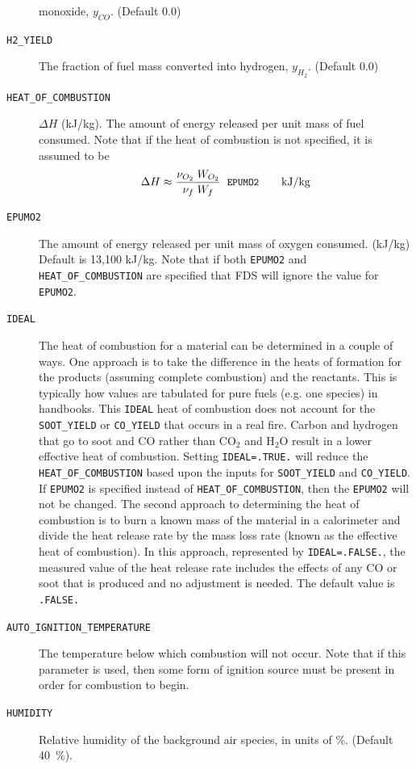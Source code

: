 \documentclass[11pt]{book}
\newcommand{\ct}{\tt\small}
\newcommand{\be}{\begin{equation}}
\newcommand{\ee}{\end{equation}}
\begin{document}
\begin{description}
monoxide, $y_{CO}$. (Default 0.0)
\item[{\ct H2\_YIELD}] The fraction of fuel mass converted into hydrogen, $y_{H_2}$. (Default 0.0)
\item[{\ct HEAT\_OF\_COMBUSTION}] $\Delta H$ (kJ/kg). The amount of
energy released per unit mass of fuel consumed. Note that if the heat of combustion is not
specified, it is assumed to be
\be \Delta H \approx \frac{\nu_{O_2} \; W_{O_2} } { \nu_{f} \; W_{f} } \; \; \hbox{\ct EPUMO2}  \quad \quad \hbox{kJ/kg}  \label{EPUMO2} \ee
\item[{\ct EPUMO2}] The amount of energy released per unit mass of oxygen consumed. (kJ/kg)
Default is 13,100 kJ/kg.  Note that if both {\ct EPUMO2} and {\ct HEAT\_OF\_COMBUSTION} are
specified that FDS will ignore the value for {\ct EPUMO2}.
\item[{\ct IDEAL}]  The heat of combustion for a material can be determined in a couple of ways.  One approach is to take the difference in the heats of formation for the products (assuming complete combustion) and the reactants.  This is typically how values are tabulated for pure fuels (e.g. one species) in handbooks.  This {\ct IDEAL} heat of combustion does not account for the  {\ct SOOT\_YIELD} or  {\ct CO\_YIELD} that occurs in a real fire.  Carbon and hydrogen that go to soot and CO rather than CO$_2$ and H$_2$O result in a lower effective heat of combustion.  Setting {\ct IDEAL=.TRUE.} will reduce the {\ct HEAT\_OF\_COMBUSTION} based upon the inputs for {\ct SOOT\_YIELD} and {\ct CO\_YIELD}. If {\ct EPUMO2} is specified instead of {\ct HEAT\_OF\_COMBUSTION}, then the {\ct EPUMO2} will not be changed.  The second approach to determining the heat of combustion is to burn a known mass of the material in a calorimeter and divide the heat release rate by the mass loss rate (known as the effective heat of combustion).  In this approach, represented by {\ct IDEAL=.FALSE.}, the measured value of the heat release rate includes the effects of any CO or soot that is produced and no adjustment is needed.  The default value is {\ct .FALSE.}
\item[{\ct AUTO\_IGNITION\_TEMPERATURE}] The temperature below which combustion will not occur.
Note that if this parameter is used, then some form of ignition source must be present in order for combustion to begin.
\item[{\ct HUMIDITY}] Relative humidity of the background air species, in units of \%. (Default 40~\%).
\end{description}
\end{document}
